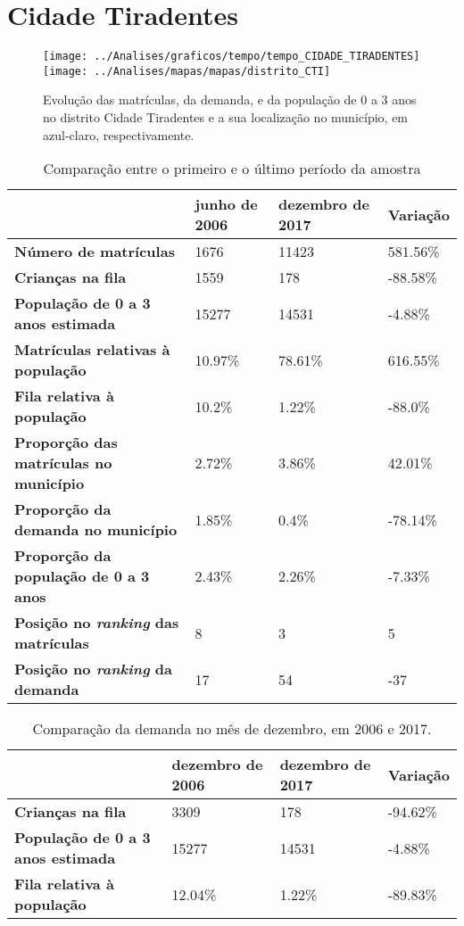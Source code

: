 \section{Cidade Tiradentes}
\begin{figure}[H]
\centering
\texttt{[image: ../Analises/graficos/tempo/tempo\_CIDADE\_TIRADENTES]}
\texttt{[image: ../Analises/mapas/mapas/distrito\_CTI]}
\caption{Evolução das matrículas, da demanda, e da população de 0 a 3 anos no distrito Cidade Tiradentes e a sua localização no município, em azul-claro, respectivamente.}
\end{figure}
\begin{table}[H]
\begin{tabular}{l|l|l|l}
\textbf{}                                      & \textbf{junho de 2006}       & \textbf{dezembro de 2017}    & \textbf{Variação} \\ \hline
\textbf{Número de matrículas}                  & 1676 & 11423 & 581.56\% \\ \hline
\textbf{Crianças na fila}                      & 1559 & 178 & -88.58\% \\ \hline
\textbf{População de 0 a 3 anos estimada}      & 15277 & 14531 & -4.88\% \\ \hline
\textbf{Matrículas relativas à população}      & 10.97\% & 78.61\% & 616.55\% \\ \hline
\textbf{Fila relativa à população}             & 10.2\% & 1.22\% & -88.0\% \\ \hline
\textbf{Proporção das matrículas no município} & 2.72\% & 3.86\% & 42.01\% \\ \hline
\textbf{Proporção da demanda no município}     & 1.85\% & 0.4\% & -78.14\% \\ \hline
\textbf{Proporção da população de 0 a 3 anos}  & 2.43\% & 2.26\% & -7.33\% \\ \hline
\textbf{Posição no \textit{ranking} das matrículas}     & 8 & 3 & 5 \\ \hline
\textbf{Posição no \textit{ranking} da demanda}         & 17 & 54 & -37 \\ 
\end{tabular}
\caption{Comparação entre o primeiro e o último período da amostra}
\end{table}
\begin{table}[H]
\begin{tabular}{l|l|l|l}
\textbf{}                                 & \textbf{dezembro de 2006} & \textbf{dezembro de 2017} & \textbf{Variação} \\ \hline
\textbf{Crianças na fila}                      & 3309 & 178 & -94.62\% \\ \hline
\textbf{População de 0 a 3 anos estimada}      & 15277 & 14531 & -4.88\% \\ \hline
\textbf{Fila relativa à população}             & 12.04\% & 1.22\% & -89.83\% \\
\end{tabular}
\caption{Comparação da demanda no mês de dezembro, em 2006 e 2017.}
\end{table}
